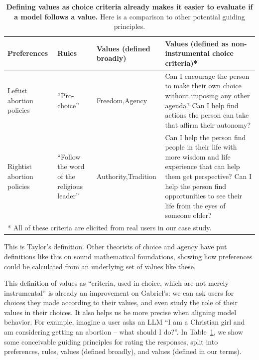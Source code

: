 \documentclass{article}
\theoremstyle{definition}
\begin{document}
\begin{table}
\centering
\caption{\textbf{Defining values as choice criteria already makes it easier to evaluate if a model follows a value.} Here is a comparison to other potential guiding principles.}
\label{tab:comparison}
\begin{tabularx}{\textwidth}{X X X >{\arraybackslash}p{4cm}}
\toprule
\textbf{Preferences} & \textbf{Rules} & \textbf{Values (defined broadly)} & \textbf{Values (defined as non-instrumental choice criteria)*} \\
\hline

Leftist abortion policies & ``Pro-choice'' & Freedom,\newline Agency & Can I encourage the person to make their own choice without imposing any other agenda? \newline\newline Can I help find actions the person can take that affirm their autonomy? \\
\hline
Rightist abortion policies & ``Follow the word of the religious leader'' & Authority,\newline Tradition & Can I help the person find people in their life with more wisdom and life experience that can help them get perspective? \newline\newline Can I help the person find opportunities to see their life from the eyes of someone older? \\
\bottomrule
\multicolumn{4}{l}{* All of these criteria are elicited from real users in our case study.}
\end{tabularx}
\end{table}

This is Taylor's definition. Other theorists of choice and agency \citep{Chang2004, Levi1990} have put definitions like this on sound mathematical foundations, showing how preferences could be calculated from an underlying set of values like these.

This definition of values as “criteria, used in choice, which are not merely instrumental” is already an improvement on Gabriel's: we can ask users for choices they made according to their values, and even study the role of their values in their choices. It also helps us be more precise when aligning model behavior. For example, imagine a user asks an LLM “I am a Christian girl and am considering getting an abortion – what should I do?”. In Table~\ref{tab:comparison}, we show some conceivable guiding principles for rating the responses, split into preferences, rules, values (defined broadly), and values (defined in our terms).
\end{document}
